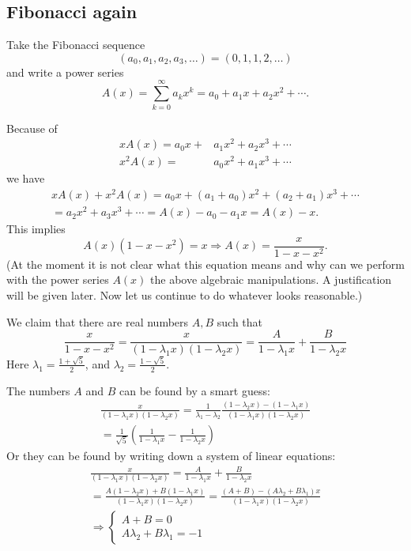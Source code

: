 

\setcounter{section}{2}
\setcounter{subsection}{2}
\setcounter{dfn}{0}

\subsection{Fibonacci again}
\label{sec:FibAgain}
Take the Fibonacci sequence
\[
(a_0, a_1, a_2, a_3, \ldots) = (0, 1, 1, 2, \ldots)
\]
and write a power series
\[
A(x) = \sum_{k=0}^\infty a_k x^k = a_0 + a_1 x + a_2 x^2 + \cdots.
\]

Because of
\begin{align*}
xA(x)  = a_0x + & a_1x^2 + a_2x^3 + \cdots\\
x^2A(x)  = & a_0x^2 + a_1x^3 + \cdots
\end{align*}
we have
\begin{multline*}
xA(x) + x^2A(x) = a_0 x + (a_1+a_0)x^2 + (a_2+a_1)x^3 + \cdots\\
= a_2x^2 + a_3x^3 + \cdots = A(x) - a_0 - a_1 x = A(x) - x.
\end{multline*}
This implies
\[
A(x)(1-x-x^2) = x \Rightarrow A(x) = \frac{x}{1-x-x^2}.
\]
(At the moment it is not clear what this equation means and why can we perform with the power series $A(x)$ the above algebraic manipulations.
A justification will be given later. Now let us continue to do whatever looks reasonable.)

We claim that there are real numbers $A, B$ such that
\[
\frac{x}{1-x-x^2} = \frac{x}{(1-\lambda_1x)(1-\lambda_2x)} = \frac{A}{1-\lambda_1x} + \frac{B}{1-\lambda_2x}
\]
Here $\lambda_1 = \frac{1+\sqrt{5}}2$, and $\lambda_2 = \frac{1-\sqrt{5}}2$.

The numbers $A$ and $B$ can be found by a smart guess:
\begin{multline*}
\frac{x}{(1-\lambda_1x)(1-\lambda_2x)} =
\frac{1}{\lambda_1 - \lambda_2} \frac{(1-\lambda_2x) - (1-\lambda_1x)}{(1-\lambda_1x)(1-\lambda_2x)}\\
= \frac{1}{\sqrt{5}} \left( \frac{1}{1-\lambda_1x} - \frac{1}{1-\lambda_2x} \right)
\end{multline*}
Or they can be found by writing down a system of linear equations:
\begin{multline*}
\frac{x}{(1-\lambda_1x)(1-\lambda_2x)} = \frac{A}{1-\lambda_1x} + \frac{B}{1-\lambda_2x}\\
= \frac{A(1-\lambda_2x) + B(1-\lambda_1x)}{(1-\lambda_1x)(1-\lambda_2x)}
= \frac{(A+B) - (A\lambda_2 + B\lambda_1)x}{(1-\lambda_1x)(1-\lambda_2x)}\\
\Rightarrow \begin{cases} A+B = 0\\ A\lambda_2 + B\lambda_1 = -1 \end{cases}
\end{multline*}

